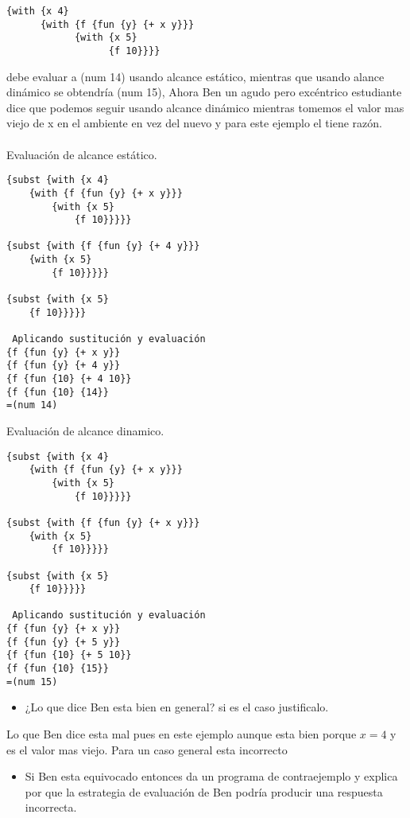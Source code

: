 \documentclass[letterpaper,11pt]{article}
\begin{document}
\begin{verbatim}
{with {x 4} 
      {with {f {fun {y} {+ x y}}} 
            {with {x 5}
                  {f 10}}}}
\end{verbatim}

debe evaluar a (num 14) usando alcance estático, mientras que usando alance dinámico se obtendría (num 15),
Ahora Ben un agudo pero excéntrico estudiante dice que podemos seguir usando alcance dinámico mientras tomemos
el valor mas viejo de x en el ambiente en vez del nuevo y para este ejemplo el tiene razón.\\\\

Evaluación de alcance estático.
\begin{verbatim}
{subst {with {x 4}
    {with {f {fun {y} {+ x y}}}
        {with {x 5}
            {f 10}}}}}
        
{subst {with {f {fun {y} {+ 4 y}}}
    {with {x 5}
        {f 10}}}}}

{subst {with {x 5}
    {f 10}}}}}
 
 Aplicando sustitución y evaluación
{f {fun {y} {+ x y}}
{f {fun {y} {+ 4 y}}
{f {fun {10} {+ 4 10}}
{f {fun {10} {14}}
=(num 14) 
 \end{verbatim}


Evaluación de alcance dinamico.
\begin{verbatim}
{subst {with {x 4}
    {with {f {fun {y} {+ x y}}}
        {with {x 5}
            {f 10}}}}}
            
{subst {with {f {fun {y} {+ x y}}}
    {with {x 5}
        {f 10}}}}}
        
{subst {with {x 5}
    {f 10}}}}}

 Aplicando sustitución y evaluación
{f {fun {y} {+ x y}}
{f {fun {y} {+ 5 y}}
{f {fun {10} {+ 5 10}}
{f {fun {10} {15}}
=(num 15) 
 \end{verbatim}


\begin{itemize}
\item ¿Lo que dice Ben esta bien en general? si es el caso justificalo.
\end{itemize}

Lo que Ben dice esta mal pues en este ejemplo aunque esta bien porque $x=4$ y es el valor mas viejo. Para un caso general esta incorrecto


\begin{itemize}
\item Si Ben esta equivocado entonces da un programa de contraejemplo y explica por que la estrategia de evaluación
de Ben podría producir una respuesta incorrecta.
\end{itemize}
\end{document}
